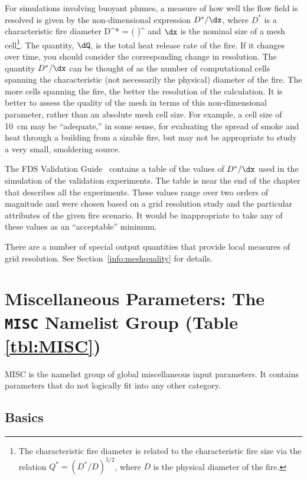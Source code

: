\documentclass[11pt]{book}
\begin{document}
For simulations involving buoyant plumes, a measure of how well the flow field is resolved is given by the
non-dimensional expression $D^*/\dx$, where $D^*$ is a characteristic
fire diameter
\be D^* = \left(
     \right)^  \ee
and $\dx$ is the nominal size of a mesh cell\footnote{The characteristic
fire diameter is related to the characteristic fire size via the
relation $Q^* = (D^*/D)^{5/2}$, where $D$ is the physical diameter of the
fire.}. The quantity, $\dQ$, is the total heat release rate of the fire. If it changes over time, you should consider the
corresponding change in resolution. The quantity $D^*/\dx$ can be thought of as the number of computational cells
spanning the characteristic (not necessarily the physical) diameter of the fire.
The more cells spanning the fire, the better the resolution of the
calculation. It is better to assess the quality of the mesh in terms
of this non-dimensional parameter, rather than an absolute mesh cell size.
For example, a cell size of 10~cm may be ``adequate,'' in some sense,
for evaluating the spread of smoke and heat through a building from a
sizable fire, but may not be appropriate to study a very small, smoldering source.

The FDS Validation Guide~\cite{FDS_Validation_Guide} contains a table of the values of $D^*/\dx$ used in the simulation of the validation experiments. The table is near the end of the chapter that describes all the experiments. These values range over two orders of magnitude and were chosen based on a grid resolution study and the particular attributes of the given fire scenario. It would be inappropriate to take any of these values as an ``acceptable'' minimum.

There are a number of special output quantities that provide local measures of grid resolution. See Section~\ref{info:meshquality} for details.




\section{Miscellaneous Parameters: The \texorpdfstring{{\tt MISC}}{MISC} Namelist Group (Table \ref{tbl:MISC})}
\label{info:MISC}

{\ct MISC} is the namelist group of global miscellaneous input parameters. It contains parameters that do not logically fit into any other category.

\subsection{Basics}
\label{info:MISC_Basics}
\end{document}
